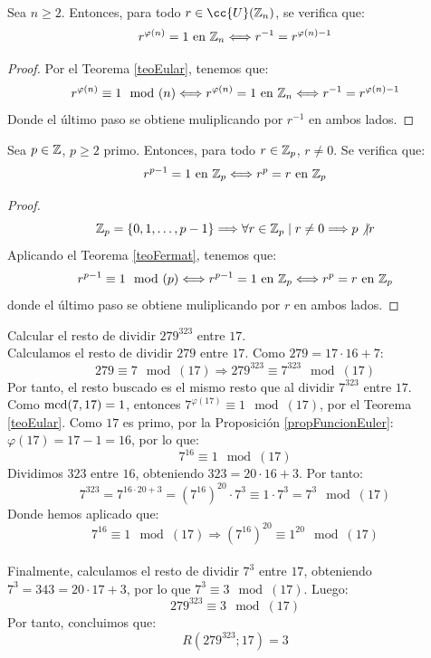 \begin{coro}
    Sea $n\geq2$. Entonces, para todo $r \in \cc{U}(\Z_n)$, se verifica que:
    $$r^{\varphi(n)}=1\text{ en } \mathbb Z_n \Longleftrightarrow r^{-1} = r^{\varphi(n)-1}$$
\begin{proof}
    Por el Teorema \ref{teoEular}, tenemos que:
    $$r^{\varphi(n)}\equiv 1\mod(n) \Longleftrightarrow r^{\varphi(n)}=1\text{ en } \mathbb Z_n \Longleftrightarrow r^{-1} = r^{\varphi(n)-1}$$
    Donde el último paso se obtiene muliplicando por $r^{-1}$ en ambos lados.
\end{proof}
\end{coro}

\begin{coro}
    Sea $p \in \mathbb Z$, $p\geq 2$ primo. Entonces, para todo $r \in \mathbb Z_p$, $r\neq 0$. Se verifica que:
    $$r^{p-1}=1 \text{ en } \mathbb Z_p \Longleftrightarrow r^p = r \text{ en } \mathbb Z_p$$
\begin{proof}
    $$\mathbb Z_p = \{0, 1, \ldots, p-1\} \Longrightarrow \forall r \in \mathbb Z_p \mid r\neq 0 \Longrightarrow p\not|r$$
    Aplicando el Teorema \ref{teoFermat}, tenemos que:
    $$r^{p-1}\equiv 1\mod(p) \Longleftrightarrow r^{p-1}=1 \text{ en } \mathbb Z_p \Longleftrightarrow r^p = r \text{ en } \mathbb Z_p$$
    donde el último paso se obtiene muliplicando por $r$ en ambos lados.
\end{proof}
\end{coro}


\begin{ejemplo}
    Calcular el resto de dividir $279^{323}$ entre $17$.\\

    
    Calculamos el resto de dividir $279$ entre $17$.
    Como $279=17 \cdot 16 + 7$:
    $$279\equiv 7\mod(17) \Longrightarrow 279^{323}\equiv 7^{323}\mod(17)$$
    Por tanto, el resto buscado es el mismo resto que al dividir $7^{323}$ entre $17$.\\

    
    Como $\operatorname{mcd}(7,17)=1$, entonces $7^{\varphi(17)}\equiv 1\mod(17)$, por el Teorema \ref{teoEular}.
    Como $17$ es primo, por la Proposición \ref{propFuncionEuler}: $\varphi(17) = 17-1 = 16$, por lo que:
    $$7^{16}\equiv 1\mod(17)$$
    Dividimos $323$ entre $16$, obteniendo $323= 20 \cdot 16 + 3$. Por tanto:
    $$7^{323}=7^{16\cdot 20+3} = (7^{16})^{20}\cdot 7^3 \equiv 1 \cdot 7^3 = 7^3\mod(17) $$
    Donde hemos aplicado que:
    $$7^{16}\equiv 1\mod(17) \Longrightarrow (7^{16})^{20}\equiv 1^{20}\mod(17)$$\\
    
    Finalmente, calculamos el resto de dividir $7^3$ entre $17$, obteniendo
    $7^3 = 343 = 20\cdot 17 + 3$, por lo que $7^3\equiv 3\mod(17)$. Luego:
    $$279^{323}\equiv 3\mod(17)$$
    Por tanto, concluimos que:
    $$R(279^{323};17)=3$$
\end{ejemplo}

